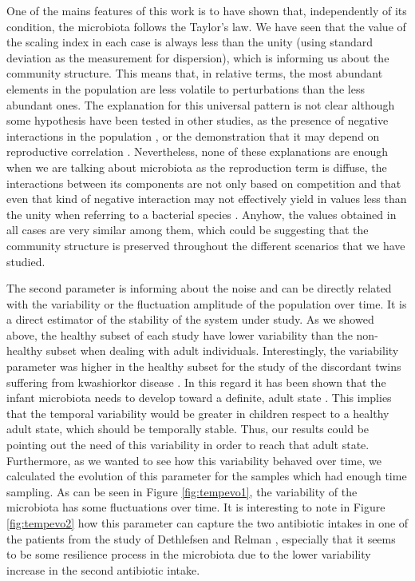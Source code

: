 One of the mains features of this work is to have shown that, independently of its condition, the microbiota follows the Taylor's law. We have seen that the value of the scaling index in each case is always less than the unity (using standard deviation as the measurement for dispersion), which is informing us about the community structure. This means that, in relative terms, the most abundant elements in the population are less volatile to perturbations than the less abundant ones. The explanation for this universal pattern is not clear although some hypothesis have been tested in other studies, as the presence of negative interactions in the population \cite{kilpatrick}, or the demonstration that it may depend on reproductive correlation \cite{ballantyne}. Nevertheless, none of these explanations are enough when we are talking about microbiota as the reproduction term is diffuse, the interactions between its components are not only based on competition \cite{joao, mehta, bucci} and that even that kind of negative interaction may not effectively yield in values less than the unity when referring to a bacterial species \cite{ramslayer}. Anyhow, the values obtained in all cases are very similar among them, which could be suggesting that the community structure is preserved throughout the different scenarios that we have studied.

The second parameter is informing about the noise and can be directly related with the variability or the fluctuation amplitude of the population over time. It is a direct estimator of the stability of the system under study. As we showed above, the healthy subset of each study have lower variability than the non-healthy subset when dealing with adult individuals. Interestingly, the variability parameter was higher in the healthy subset for the study of the discordant twins suffering from kwashiorkor disease \cite{kwashiorkor}. In this regard it has been shown that the infant microbiota needs to develop toward a definite, adult state \cite{koenig}. This implies that the temporal variability would be greater in children respect to a healthy adult state, which should be temporally stable. Thus, our results could be pointing out the need of this variability in order to reach that adult state. Furthermore, as we wanted to see how this variability behaved over time, we calculated the evolution of this parameter for the samples which had enough time sampling. As can be seen in Figure \ref{fig:tempevo1}, the variability of the microbiota has some fluctuations over time. It is interesting to note in Figure \ref{fig:tempevo2} how this parameter can capture the two antibiotic intakes in one of the patients from the study of Dethlefsen and Relman \cite{antibiotic}, especially that it seems to be some resilience process in the microbiota due to the lower variability increase in the second antibiotic intake.  

